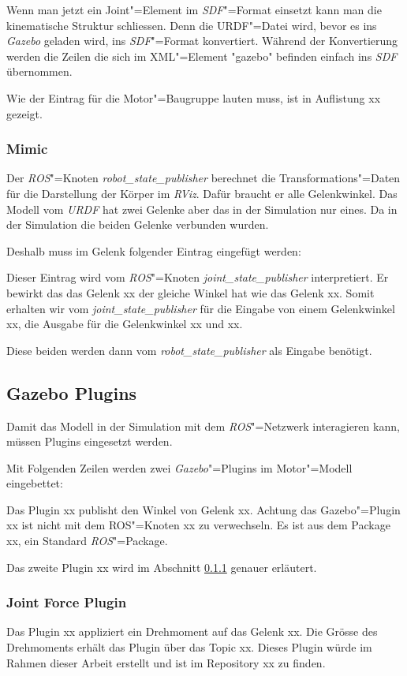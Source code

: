 Wenn man jetzt ein Joint"=Element im \textit{SDF}"=Format einsetzt kann man die kinematische Struktur schliessen.
Denn die {URDF}"=Datei wird, bevor es ins \textit{Gazebo} geladen wird, ins \textit{SDF}"=Format konvertiert.
Während der Konvertierung werden die Zeilen die sich im XML"=Element \textsc{"}gazebo\textsc{"} befinden einfach ins \textit{SDF} übernommen.

Wie der Eintrag für die Motor"=Baugruppe lauten muss, ist in Auflistung xx gezeigt.

\subsubsection{Mimic}
Der \textit{ROS}"=Knoten \textit{robot\_state\_publisher} berechnet die Transformations"=Daten für die Darstellung der Körper im \textit{RViz}.
Dafür braucht er alle Gelenkwinkel.
Das Modell vom \textit{URDF} hat zwei Gelenke aber das in der Simulation nur eines.
Da in der Simulation die beiden Gelenke verbunden wurden.

Deshalb muss im Gelenk folgender Eintrag eingefügt werden: %

Dieser Eintrag wird vom \textit{ROS}"=Knoten \textit{joint\_state\_publisher} interpretiert.
Er bewirkt das das Gelenk xx der gleiche Winkel hat wie das Gelenk xx.
Somit erhalten wir vom \textit{joint\_state\_publisher} für die Eingabe von einem Gelenkwinkel xx, die Ausgabe für die Gelenkwinkel xx und xx.

Diese beiden werden dann vom \textit{robot\_state\_publisher} als Eingabe benötigt.

\subsection{Gazebo Plugins}
Damit das Modell in der Simulation mit dem \textit{ROS}"=Netzwerk interagieren kann, müssen Plugins eingesetzt werden.

Mit Folgenden Zeilen werden zwei \textit{Gazebo}"=Plugins im Motor"=Modell eingebettet:

Das Plugin xx publisht den Winkel von Gelenk xx.
Achtung das Gazebo"=Plugin xx ist nicht mit dem ROS"=Knoten xx zu verwechseln.
Es ist aus dem Package xx, ein Standard \textit{ROS}"=Package.

Das zweite Plugin xx wird im Abschnitt \ref{chap:joint-force-plugin} genauer erläutert.

\subsubsection{Joint Force Plugin}
\label{chap:joint-force-plugin}
Das Plugin xx appliziert ein Drehmoment auf das Gelenk xx.
Die Grösse des Drehmoments erhält das Plugin über das Topic xx.
Dieses Plugin würde im Rahmen dieser Arbeit erstellt und ist im Repository xx zu finden. 


